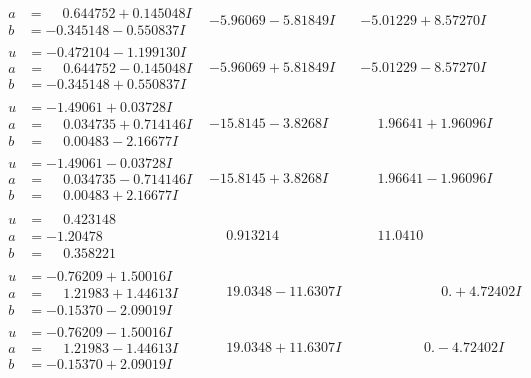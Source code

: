 \documentclass[1p]{elsarticle_modified}
\theoremstyle{definition}
\begin{document}
$$\begin{array}{c|c|c}
\begin{aligned}
a &= \phantom{-}0.644752 + 0.145048 I \\
b &= -0.345148 - 0.550837 I\end{aligned}
 & -5.96069 - 5.81849 I & -5.01229 + 8.57270 I \\ \hline\begin{aligned}
u &= -0.472104 - 1.199130 I \\
a &= \phantom{-}0.644752 - 0.145048 I \\
b &= -0.345148 + 0.550837 I\end{aligned}
 & -5.96069 + 5.81849 I & -5.01229 - 8.57270 I \\ \hline\begin{aligned}
u &= -1.49061 + 0.03728 I \\
a &= \phantom{-}0.034735 + 0.714146 I \\
b &= \phantom{-}0.00483 - 2.16677 I\end{aligned}
 & -15.8145 - 3.8268 I & \phantom{-}1.96641 + 1.96096 I \\ \hline\begin{aligned}
u &= -1.49061 - 0.03728 I \\
a &= \phantom{-}0.034735 - 0.714146 I \\
b &= \phantom{-}0.00483 + 2.16677 I\end{aligned}
 & -15.8145 + 3.8268 I & \phantom{-}1.96641 - 1.96096 I \\ \hline\begin{aligned}
u &= \phantom{-}0.423148\phantom{ +0.000000I} \\
a &= -1.20478\phantom{ +0.000000I} \\
b &= \phantom{-}0.358221\phantom{ +0.000000I}\end{aligned}
 & \phantom{-}0.913214\phantom{ +0.000000I} & \phantom{-}11.0410\phantom{ +0.000000I} \\ \hline\begin{aligned}
u &= -0.76209 + 1.50016 I \\
a &= \phantom{-}1.21983 + 1.44613 I \\
b &= -0.15370 - 2.09019 I\end{aligned}
 & \phantom{-}19.0348 - 11.6307 I & \phantom{-0.000000 -}0. + 4.72402 I \\ \hline\begin{aligned}
u &= -0.76209 - 1.50016 I \\
a &= \phantom{-}1.21983 - 1.44613 I \\
b &= -0.15370 + 2.09019 I\end{aligned}
 & \phantom{-}19.0348 + 11.6307 I & \phantom{-0.000000 } 0. - 4.72402 I \\ \hline\begin{aligned}

\end{aligned}
\end{array}$$
\end{document}

